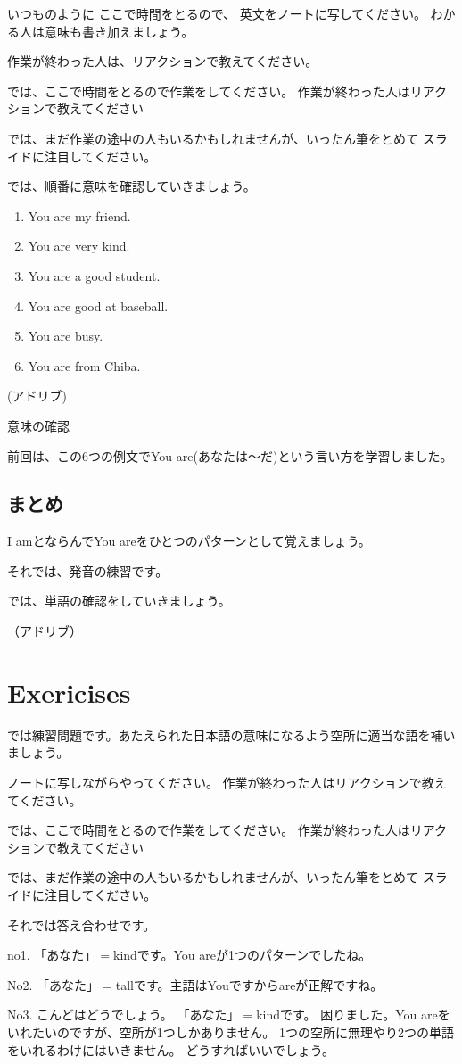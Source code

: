 \documentclass[book,jafontscale=0.9247]{jlreq}
\newcommand{\mySagyo}{%
\par%
\bigskip
では、ここで時間をとるので作業をしてください。
作業が終わった人はリアクションで教えてください\par%
\begin{minipage}[t]{.98\textwidth}
\mbox{}\hrulefill\mbox{}\par%
\mbox{}\hfill{}\raisebox{-.5\height}{作業}\hfill\mbox{}\par%
\mbox{}\hrulefill\mbox{}
\end{minipage}%
\par%
\bigskip%
では、まだ作業の途中の人もいるかもしれませんが、いったん筆をとめて
スライドに注目してください。%
\par%
\bigskip
}
\begin{document}
いつものように
ここで時間をとるので、
英文をノートに写してください。
わかる人は意味も書き加えましょう。

作業が終わった人は、リアクションで教えてください。

\mySagyo

では、順番に意味を確認していきましょう。


\begin{enumerate}
 \item You are my friend.
 \item You are very kind.
 \item You are a good student.
 \item You are good at baseball.
 \item You are busy.
 \item You are from Chiba.
\end{enumerate}

(アドリブ)

意味の確認

前回は、この6つの例文でYou are(あなたは〜だ)という言い方を学習しました。


\subsection{まとめ}

I amとならんでYou areをひとつのパターンとして覚えましょう。

それでは、発音の練習です。

では、単語の確認をしていきましょう。

（アドリブ）

\newpage
\section{Exericises}

では練習問題です。あたえられた日本語の意味になるよう空所に適当な語を補いましょう。

ノートに写しながらやってください。
作業が終わった人はリアクションで教えてください。

\mySagyo

それでは答え合わせです。

no1.
「あなた」$=$kindです。You areが1つのパターンでしたね。

No2.
「あなた」$=$tallです。主語はYouですからareが正解ですね。

No3.
こんどはどうでしょう。
「あなた」$=$kindです。
困りました。You areをいれたいのですが、空所が1つしかありません。
1つの空所に無理やり2つの単語をいれるわけにはいきません。
どうすればいいでしょう。
\end{document}
